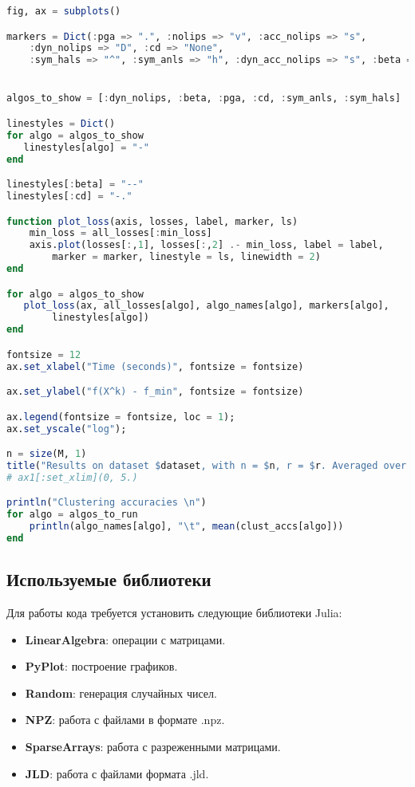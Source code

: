 \documentclass[a4paper,11pt]{article}
\begin{document}
\begin{lstlisting}[language=Julia, caption={Графики и анализ}, label={lst:example4}]
fig, ax = subplots()

markers = Dict(:pga => ".", :nolips => "v", :acc_nolips => "s",
    :dyn_nolips => "D", :cd => "None",
    :sym_hals => "^", :sym_anls => "h", :dyn_acc_nolips => "s", :beta => "None")


algos_to_show = [:dyn_nolips, :beta, :pga, :cd, :sym_anls, :sym_hals]

linestyles = Dict()
for algo = algos_to_show
   linestyles[algo] = "-" 
end

linestyles[:beta] = "--"
linestyles[:cd] = "-."

function plot_loss(axis, losses, label, marker, ls)
    min_loss = all_losses[:min_loss]
    axis.plot(losses[:,1], losses[:,2] .- min_loss, label = label,
        marker = marker, linestyle = ls, linewidth = 2)
end

for algo = algos_to_show
   plot_loss(ax, all_losses[algo], algo_names[algo], markers[algo],
        linestyles[algo]) 
end

fontsize = 12
ax.set_xlabel("Time (seconds)", fontsize = fontsize)

ax.set_ylabel("f(X^k) - f_min", fontsize = fontsize)

ax.legend(fontsize = fontsize, loc = 1);
ax.set_yscale("log");

n = size(M, 1)
title("Results on dataset $dataset, with n = $n, r = $r. Averaged over $n_runs runs")
# ax1[:set_xlim](0, 5.)

println("Clustering accuracies \n")
for algo = algos_to_run
    println(algo_names[algo], "\t", mean(clust_accs[algo]))
end
\end{lstlisting}

\subsection{Используемые библиотеки}
Для работы кода требуется установить следующие библиотеки Julia:
\begin{itemize}
    \item \textbf{LinearAlgebra}: операции с матрицами.
    \item \textbf{PyPlot}: построение графиков.
    \item \textbf{Random}: генерация случайных чисел.
    \item \textbf{NPZ}: работа с файлами в формате .npz.
    \item \textbf{SparseArrays}: работа с разреженными матрицами.
    \item \textbf{JLD}: работа с файлами формата .jld.
\end{itemize}
\end{document}
